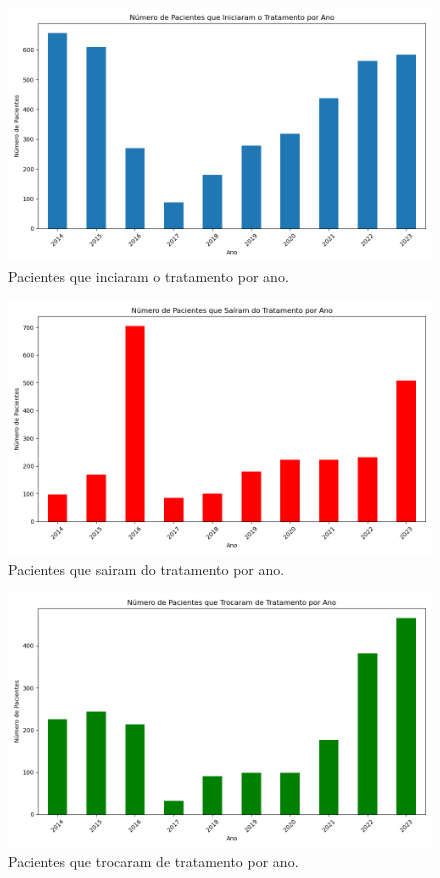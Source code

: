 \documentclass[article,a4paper,12pt,brazil,sumario=tradicional]{abntex2}
\begin{document}
\begin{figure}[!ht]
    \centering
    \includegraphics[width=1\textwidth]{pacientes_iniciaram_tratamento_por_ano.png}
    \caption{Pacientes que inciaram o tratamento por ano.}
    \label{fig:pacientes_iniciaram_tratamento_por_ano}
\end{figure}

\begin{figure}[!ht]
    \centering
    \includegraphics[width=1\textwidth]{pacientes_sairam_tratamento_por_ano.png}
    \caption{Pacientes que sairam do tratamento por ano.}
    \label{fig:pacientes_sairam_tratamento_por_ano}
\end{figure}

\begin{figure}[!ht]
    \centering
    \includegraphics[width=1\textwidth]{pacientes_troca_tratamento_por_ano.png}
    \caption{Pacientes que trocaram de tratamento por ano.}
    \label{fig:pacientes_troca_tratamento_por_ano}
\end{figure}
\end{document}
